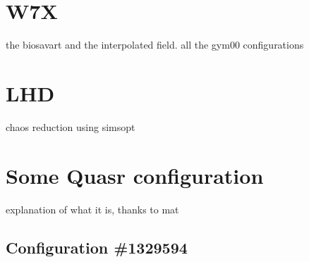 
\chapter{W7X}
the biosavart and the interpolated field. all the gym00 configurations

\chapter{LHD}
chaos reduction using simsopt

\chapter{Some Quasr configuration}
explanation of what it is, thanks to mat
\section{Configuration \#1329594}
